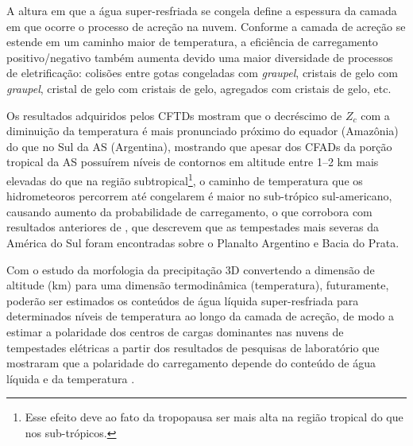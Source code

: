
A altura em que a água super-resfriada se congela define a espessura da camada em que ocorre o processo de  acreção na nuvem. Conforme a camada de acreção se estende em um caminho maior de temperatura, a eficiência de carregamento positivo/negativo também aumenta devido uma maior diversidade de processos de eletrificação: colisões entre gotas congeladas com \textit{graupel}, cristais de gelo com \textit{graupel}, cristal de gelo com cristais de gelo, agregados com cristais de gelo,  etc. 

Os resultados adquiridos pelos CFTDs mostram que o decréscimo de $Z_c$ com a diminuição da temperatura é mais pronunciado próximo do equador (Amazônia) do que no Sul da AS (Argentina), mostrando que apesar dos CFADs da porção tropical da AS possuírem níveis de contornos em altitude entre 1--2 km mais elevadas do que na região subtropical\footnote{Esse efeito deve ao fato da tropopausa ser mais alta na região tropical do que nos sub-trópicos.}, o caminho de temperatura que os hidrometeoros percorrem até congelarem é maior no sub-trópico sul-americano, causando aumento da probabilidade de carregamento, o que corrobora com resultados anteriores de  , que descrevem que as tempestades mais severas da América do Sul foram encontradas sobre o Planalto Argentino e Bacia do Prata.
 
Com o estudo da morfologia da precipitação 3D convertendo a dimensão de altitude (km) para uma dimensão termodinâmica (temperatura), futuramente, poderão ser estimados os conteúdos de água líquida super-resfriada \cite{sekhon1971, hagen2003} para determinados níveis de temperatura ao longo da camada de acreção, de modo a estimar a polaridade dos centros de cargas dominantes nas nuvens de tempestades elétricas a partir dos resultados de pesquisas de laboratório que mostraram que a polaridade do carregamento depende do conteúdo de água líquida e da temperatura \cite{Takahashi1978,Saunders1999,saunders2008}.


